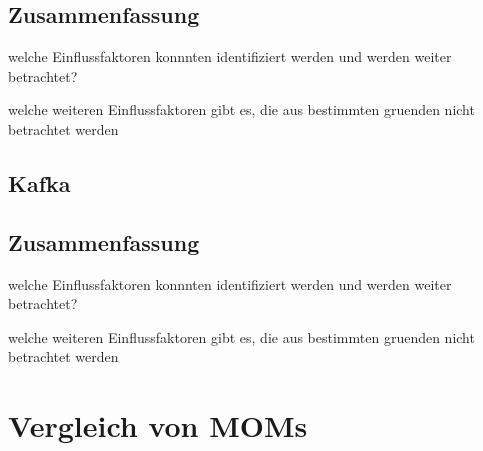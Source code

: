 \subsection{Zusammenfassung}
welche Einflussfaktoren konnnten identifiziert werden und werden weiter betrachtet? 

welche weiteren Einflussfaktoren gibt es, die aus bestimmten gruenden nicht betrachtet werden \\
\subsection{Kafka}

\subsection{Zusammenfassung}
welche Einflussfaktoren konnnten identifiziert werden und werden weiter betrachtet? 

welche weiteren Einflussfaktoren gibt es, die aus bestimmten gruenden nicht betrachtet werden \\
\section{Vergleich von MOMs}


